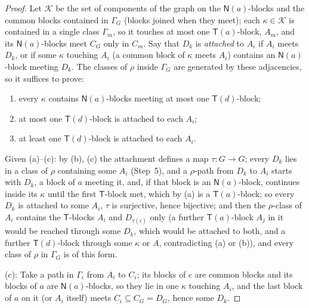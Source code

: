 \documentclass[11pt]{amsart}
\theoremstyle{definition}
\newcommand{\T}{\mathsf{T}}
\newcommand{\N}{\mathsf{N}}
\begin{document}
\begin{proof}
Let $\mathcal K$ be the set of components of the graph on the $\N(a)$-blocks and the common blocks contained in $\Gamma_G$ (blocks joined when they meet); each $\kappa\in\mathcal K$ is contained in a single class $\Gamma_m$, so it touches at most one $\T(a)$-block, $A_m$, and its $\N(a)$-blocks meet $C_G$ only in $C_m$. Say that $D_k$ is \emph{attached} to $A_i$ if $A_i$ meets $D_k$, or if some $\kappa$ touching $A_i$ (a common block of $\kappa$ meets $A_i$) contains an $\N(a)$-block meeting $D_k$. The classes of $\rho$ inside $\Gamma_G$ are generated by these adjacencies, so it suffices to prove:
\begin{enumerate}[nosep,label=(\alph*)]
\item every $\kappa$ contains $\N(a)$-blocks meeting at most one $\T(d)$-block;
\item at most one $\T(d)$-block is attached to each $A_i$;
\item at least one $\T(d)$-block is attached to each $A_i$.
\end{enumerate}
Given (a)--(c): by (b), (c) the attachment defines a map $\tau\colon G\to G$; every $D_k$ lies in a class of $\rho$ containing some $A_i$ (Step~5), and a $\rho$-path from $D_k$ to $A_i$ starts with $D_k$, a block of $a$ meeting it, and, if that block is an $\N(a)$-block, continues inside its $\kappa$ until the first $\T$-block met, which by (a) is a $\T(a)$-block; so every $D_k$ is attached to some $A_i$, $\tau$ is surjective, hence bijective; and then the $\rho$-class of $A_i$ contains the $\T$-blocks $A_i$ and $D_{\tau(i)}$ only (a further $\T(a)$-block $A_j$ in it would be reached through some $D_k$, which would be attached to both, and a further $\T(d)$-block through some $\kappa$ or $A$, contradicting (a) or (b)), and every class of $\rho$ in $\Gamma_G$ is of this form.

(c): Take a path in $\Gamma_i$ from $A_i$ to $C_i$; its blocks of $c$ are common blocks and its blocks of $a$ are $\N(a)$-blocks, so they lie in one $\kappa$ touching $A_i$, and the last block of $a$ on it (or $A_i$ itself) meets $C_i\subseteq C_G=D_G$, hence some $D_k$.


\end{proof}
\end{document}
